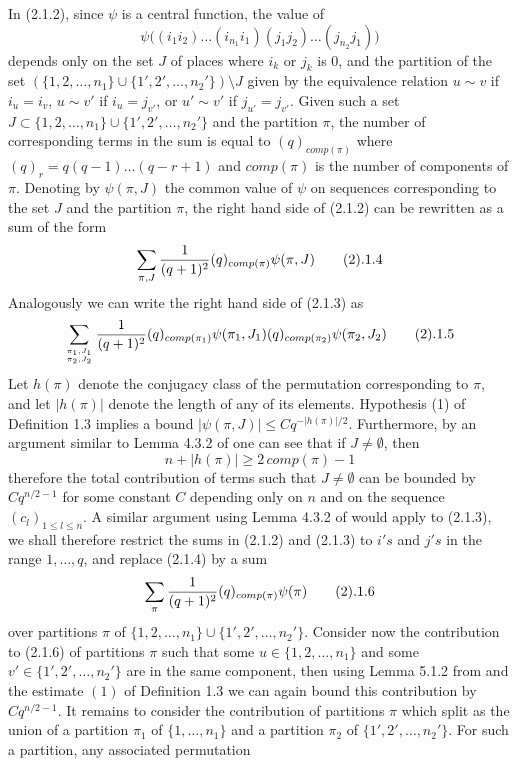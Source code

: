  In (2.1.2), since $\psi$ is a central function, the value of
 $$
 \psi\bigl((i_1i_2)\ldots (i_{n_1}i_1)
 (j_1j_2)\ldots (j_{n_2}j_1)\bigr)
 $$ depends only on the set $J$ of places where $i_k$ or $j_k$ is 0, and the
 partition of the set 
 $(\{1,2,\ldots,n_1\}\cup\{1',2',\ldots,n_2'\})\setminus J$ given by
 the equivalence relation $u\sim v$ if $i_u=i_v$, $u\sim v'$ if $i_u=j_{v'}$, or
 $u'\sim v'$ if $j_{u'}= j_{v'}$. Given such a set $J\subset
 \{1,2,\ldots,n_1\}\cup\{1',2',\ldots,n_2'\}$ and the  partition $\pi$,
  the number of corresponding terms
 in the sum is equal to $(q)_{comp(\pi)}$ where $(q)_r=q(q-1)\ldots (q-r+1)$
  and
 $comp(\pi)$ is the number of components of $\pi$. Denoting by
 $\psi(\pi,J)$ the common value of $\psi$ on sequences corresponding to the set
 $J$ and the 
 partition $\pi$,   the right hand side of (2.1.2) can be rewritten as 
  a sum  of the form
 $$
 \sum_{\pi,J}{1\over (q+1)^2}(q)_{comp(\pi)}\psi(\pi,J)\tag 2.1.4
 $$
 Analogously we can write the right hand side of (2.1.3) as
  $$
 \sum_{\pi_1,J_1\atop\pi_2,J_2}
 {1\over (q+1)^2}(q)_{comp(\pi_1)}\psi(\pi_1,J_1)
 (q)_{comp(\pi_2)}\psi(\pi_2,J_2)\tag 2.1.5
 $$
 Let $h(\pi)$ denote the conjugacy class of the permutation corresponding to
 $\pi$, and let $|h(\pi)|$ denote the length of any of its elements. 
 Hypothesis (1) of Definition 1.3 implies a bound   
 $|\psi(\pi,J)|\leq C q^{-|h(\pi)|/2}$. Furthermore, by an argument similar to
 Lemma 4.3.2 of \cite{B} one can see that if $J\not=\emptyset$, then 
 $$n+|h(\pi)|\geq 2\,comp(\pi)-1$$
 therefore the  total
 contribution of  terms   such that $J\not=\emptyset$ 
  can be bounded by $Cq^{n/2-1}$
 for some constant $C$ depending only on $n$ and on the sequence
 $(c_l)_{1\leq l\leq n}$. A similar argument using Lemma 4.3.2 of \cite{B}
  would apply to (2.1.3), we
 shall therefore restrict the sums in (2.1.2) and (2.1.3)
 to $i's$ and $j's$ in the range
 $1,\ldots, q$, and replace (2.1.4) by a sum
  $$
 \sum_{\pi}{1\over (q+1)^2}(q)_{comp(\pi)}\psi(\pi)\tag 2.1.6
 $$
 over partitions $\pi$ of $ \{1,2,\ldots,n_1\}\cup\{1',2',\ldots,n_2'\}$.
 Consider now the contribution to (2.1.6) of
 partitions $\pi$ such that some $u\in\{1,2,\ldots,n_1\}$ and some 
 $v'\in\{1',2',\ldots,n_2'\}$ are in the same component,
 then using Lemma 5.1.2 from \cite{B} and the estimate $(1)$ of 
 Definition 1.3 we can again
  bound this
 contribution by $Cq^{n/2-1}$.
 It remains to consider the contribution of partitions $\pi$ which split as the
 union of a partition $\pi_1$
  of $\{1,\ldots,n_1\}$ and a partition $\pi_2$ of $\{1',2',\ldots,
 n_2'\}$. For such a partition, any  associated permutation 
